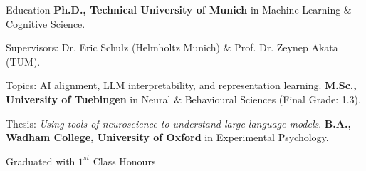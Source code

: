 \begin{rubric}{Education}
	\entry*[2023 -- \; \ldots \; ]
	\textbf{Ph.D., Technical University of Munich} in Machine Learning \& Cognitive Science.\par
	\par Supervisors: Dr. Eric Schulz (Helmholtz Munich) \& Prof. Dr. Zeynep Akata (TUM).
	\par Topics: AI alignment, LLM interpretability, and representation learning.
%
\entry*[2021 -- 2023]%
	\textbf{M.Sc., University of Tuebingen} in Neural \& Behavioural Sciences (Final Grade: 1.3).\par
	Thesis: \emph{Using tools of neuroscience to understand large language models}.
% 
\entry*[2017 -- 2020]%
	\textbf{B.A., Wadham College, University of Oxford} in Experimental Psychology.\par
	Graduated with $1^{st}$ Class Honours
\end{rubric}